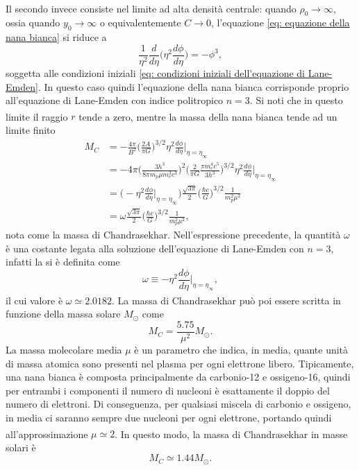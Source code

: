 \documentclass{article}
\newcommand{\supcite}[2][]{\textsuperscript{\cite[#1]{#2}}}
\numberwithin{equation}{section}
\begin{document}
Il secondo\supcite[pgg.~213--214]{chandrasekhar1935} invece consiste nel limite ad alta densità centrale: quando $\rho_0 \to \infty$, ossia quando $y_0 \to \infty$ o equivalentemente $C \to 0$, l'equazione \eqref{eq: equazione della nana bianca} si riduce a
\begin{equation}
    \frac{1}{\eta^2}\frac{d}{d\eta}\bigg(\eta^2\frac{d\phi}{d\eta}\bigg) = -\phi^3,
\end{equation}
soggetta alle condizioni iniziali \eqref{eq: condizioni iniziali dell'equazione di Lane-Emden}. In questo caso quindi l'equazione della nana bianca corrisponde proprio all'equazione di Lane-Emden con indice politropico $n = 3$. Si noti che in questo limite il raggio $r$ tende a zero, mentre la massa della nana bianca\supcite[pg.~213]{chandrasekhar1935} tende ad un limite finito
\begin{equation}
\label{eq: massa di Chandrasekhar}
    \begin{aligned}
        M_C &= -\frac{4\pi}{B^2}\bigg(\frac{2A}{\pi G}\bigg)^{3/2}\eta^2\frac{d\phi}{d\eta}\bigg|_{\eta = \eta_\infty} \\
        &= -4\pi\bigg(\frac{3h^3}{8\pi m_p\mu m_e^3 c^3}\bigg)^2\bigg(\frac{2}{\pi G}\frac{\pi m_e^4 c^5}{3h^3}\bigg)^{3/2}\eta^2\frac{d\phi}{d\eta}\bigg|_{\eta = \eta_\infty} \\
        &= \bigg(-\eta^2\frac{d\phi}{d\eta}\bigg|_{\eta = \eta_\infty}\bigg)\frac{\sqrt{3\pi}}{2}\bigg(\frac{\hbar c}{G}\bigg)^{3/2}\frac{1}{m_p^2\mu^2} \\
        &= \omega\frac{\sqrt{3\pi}}{2}\bigg(\frac{\hbar c}{G}\bigg)^{3/2}\frac{1}{m_p^2\mu^2},
    \end{aligned}
\end{equation}
nota come la massa di Chandrasekhar. Nell'espressione precedente, la quantità $\omega$ è una costante legata alla soluzione dell'equazione di Lane-Emden con $n = 3$, infatti la si è definita come
\begin{equation}
    \omega \equiv -\eta^2\frac{d\phi}{d\eta}\bigg|_{\eta = \eta_\infty},
\end{equation}
il cui valore\supcite[tab.~1]{chandrasekhar1935} è $\omega \simeq 2.0182$. La massa di Chandrasekhar\supcite[pg.~214]{chandrasekhar1935} può poi essere scritta in funzione della massa solare $M_\odot$ come
\begin{equation}
    M_C = \frac{5.75}{\mu^2}M_\odot.
\end{equation}
La massa molecolare media $\mu$ è un parametro che indica, in media, quante unità di massa atomica sono presenti nel plasma per ogni elettrone libero. Tipicamente, una nana bianca è composta principalmente da carbonio-12 e ossigeno-16, quindi per entrambi i componenti il numero di nucleoni è esattamente il doppio del numero di elettroni. Di conseguenza, per qualsiasi miscela di carbonio e ossigeno, in media ci saranno sempre due nucleoni per ogni elettrone, portando quindi all'approssimazione $\mu \simeq 2$\supcite[pg.6]{chavanis2007}\supcite[pg.6]{thomas2011}. In questo modo, la massa di Chandrasekhar in masse solari è 
\begin{equation}
\label{eq: massa di Chadrasekhar in masse solari}
    M_C \simeq 1.44 M_\odot.
\end{equation}
\end{document}
